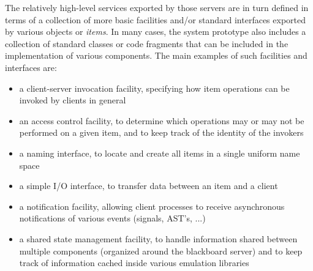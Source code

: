 The relatively high-level services exported by those servers are in
turn defined in terms of a collection of more basic facilities and/or
standard interfaces exported by various objects or {\em items}. 
In many cases, the system prototype also includes a collection of
standard classes or code fragments that can be included in the
implementation of various components. The main examples of such
facilities and interfaces are:
\begin{itemize}
\item a client-server invocation facility, specifying how item
operations can be invoked by clients in general

\item an access control facility, to determine which operations may or
may not be performed on a given item, and to keep track of the
identity of the invokers

\item a naming interface, to locate and create all items in a single
uniform name space

\item a simple I/O interface, to transfer data between an item and a
client

\item a notification facility, allowing client processes to receive
asynchronous notifications of various events (signals, AST's, ...)

\item a shared state management facility, to handle information shared
between multiple components (organized around the blackboard server)
and to keep track of information cached inside various emulation
libraries

\end{itemize}


